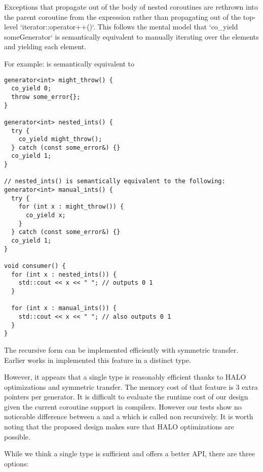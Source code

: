 \documentclass{wg21}
\begin{document}
Exceptions that propagate out of the body of nested  coroutines
are rethrown into the parent coroutine from the  expression rather
than propagating out of the top-level `iterator::operator++()`. This follows the
mental model that `co_yield someGenerator` is semantically equivalent to manually
iterating over the elements and yielding each element.

For example:  is semantically equivalent to 
\begin{lstlisting}[style=color]
generator<int> might_throw() {
  co_yield 0;
  throw some_error{};
}

generator<int> nested_ints() {
  try {
    co_yield might_throw();
  } catch (const some_error&) {}
  co_yield 1;
}

// nested_ints() is semantically equivalent to the following:
generator<int> manual_ints() {
  try {
    for (int x : might_throw()) {
      co_yield x;
    }
  } catch (const some_error&) {}
  co_yield 1;
}

void consumer() {
  for (int x : nested_ints()) {
    std::cout << x << " "; // outputs 0 1
  }
  
  for (int x : manual_ints()) {
    std::cout << x << " "; // also outputs 0 1
  }
}
\end{lstlisting}


The recursive form can be implemented efficiently with symmetric transfer.
Earlier works in \cite{CppCoro} implemented this feature in a distinct  type.

However, it appears that a single type is reasonably efficient thanks to HALO optimizations and symmetric transfer.
The memory cost of that feature is 3 extra pointers per generator.
It is difficult to evaluate the runtime cost of our design given the current coroutine support in compilers.
However our tests show no noticeable difference between a  and a  
which is called non recursively. It is worth noting that the proposed design makes sure that HALO \cite{P0981R0} optimizations are possible.

While we think a single  type is sufficient and offers a better API, there are three options:
\end{document}
